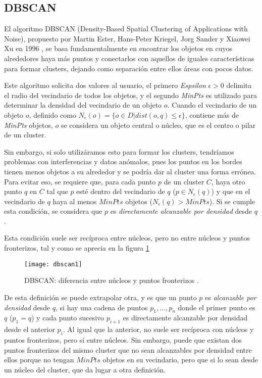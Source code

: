\documentclass[10pt, a4paper]{article}
\begin{document}


\subsection{\textbf{DBSCAN}} \label{subsec:dbscan}


El algoritmo DBSCAN (Density-Based Spatial Clustering of Applications with Noise), propuesto por Martin Ester, Hans-Peter Kriegel, Jorg Sander y Xiaowei Xu en 1996 \cite{DBSCAN}, se basa fundamentalmente en encontrar los objetos en cuyos alrededores haya más puntos y conectarlos con aquellos de iguales características para formar clusters, dejando como separación entre ellos áreas con pocos datos.

Este algoritmo solicita dos valores al usuario, el primero \textit{Espsilon} $\epsilon > 0$ delimita el radio del vecindario de todos los objetos, y el segundo \textit{MinPts} es utilizado para determinar la densidad del vecindario de un objeto $o$. Cuando el vecindario de un objeto $o$, definido como $N_{\epsilon}(o) = \{o \in D | dist(o,q) \leq \epsilon\}$, contiene más de \textit{MinPts} objetos, $o$ se considera un objeto central o núcleo, que es el centro o pilar de un cluster.

Sin embargo, si solo utilizáramos esto para formar los clusters, tendríamos problemas con interferencias y datos anómalos, pues los puntos en los bordes tienen menos objetos a su alrededor y se podría dar al cluster una forma errónea. Para evitar eso, se requiere que, para cada punto $p$ de un cluster $C$, haya otro punto $q$ en $C$ tal que $p$ esté dentro del vecindario de $q$ ($p  \in N_{\epsilon}(q)$) y que en el vecindario de $q$ haya al menos $MinPts$ objetos ($N_{\epsilon}(q) > MinPts$). Si se cumple esta condición, se considera que $p$ es \textit{directamente alcanzable por densidad} desde $q$.

Esta condición suele ser recíproca entre núcleos, pero no entre núcleos y puntos fronterizos, tal y como se aprecia en la figura \ref{fig:dbscan1}

\begin{figure}[ht]
\centering
\texttt{[image: dbscan1]}
\caption{DBSCAN: diferencia entre núcleos y puntos fronterizos \cite{DBSCAN}.}
\label{fig:dbscan1}
\end{figure}

De esta definición se puede extrapolar otra, y es que un punto $p$ es \textit{alcanzable por densidad} desde $q$, si hay una cadena de puntos $p_1, \ldots, p_n$ donde el primer punto es $q$ ($p_1 = q$) y cada punto sucesivo $p_{i+1}$ es directamente alcanzable por densidad desde el anterior $p_i$. Al igual que la anterior, no suele ser recíproca con núcleos y puntos fronterizos, pero sí entre núcleos. Sin embargo, puede que existan dos puntos fronterizos del mismo cluster que no sean alcanzables por densidad entre ellos porque no tengan $MinPts$ objetos en su vecindario, pero que si lo sean desde un núcleo del cluster, que da lugar a otra definición.
 
\end{document}
